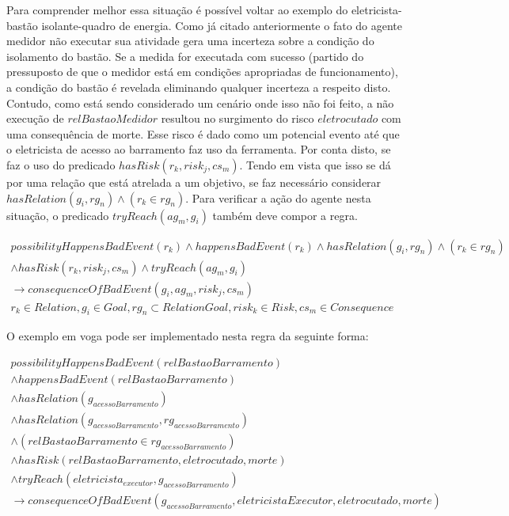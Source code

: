Para comprender melhor essa situação é possível voltar ao exemplo do eletricista-bastão isolante-quadro de energia. Como já citado anteriormente o fato 
do agente medidor não executar sua atividade gera uma incerteza sobre a condição do isolamento do bastão. Se a medida for executada com sucesso 
(partido do pressuposto de que o medidor está em condições apropriadas de funcionamento), a condição do bastão é revelada eliminando qualquer incerteza 
a respeito disto. Contudo, como está sendo considerado um cenário onde isso não foi feito, a não execução de $relBastaoMedidor$ resultou no surgimento 
do risco $eletrocutado$ com uma consequência de morte. Esse risco é dado como um potencial evento até que o eletricista de acesso ao barramento faz uso da 
ferramenta. Por conta disto, se faz o uso do predicado $hasRisk(r_k,risk_j,cs_m)$. Tendo em vista que isso se dá por uma relação que está atrelada a um 
objetivo, se faz necessário considerar $hasRelation(g_i,rg_n) \wedge (r_k \in rg_n)$. Para verificar a ação do agente nesta situação, o predicado 
$tryReach(ag_m,g_i)$ também deve compor a regra.


\begin{eqnarray}\label{paybutiamnotguilty}
	possibilityHappensBadEvent(r_k) \wedge  happensBadEvent(r_k) \wedge hasRelation(g_i,rg_n) \wedge (r_k \in rg_n) \nonumber \\ 
	\wedge hasRisk(r_k,risk_j,cs_m) \wedge tryReach(ag_m,g_i) \nonumber \\ 
	\to consequenceOfBadEvent(g_i,ag_m,risk_j,cs_m) \nonumber \\ 
    r_k \in Relation, g_i \in Goal, rg_n \subset RelationGoal, risk_k \in Risk, cs_m \in Consequence
\end{eqnarray}

O exemplo em voga pode ser implementado nesta regra da seguinte forma: 


\begin{eqnarray}\nonumber
   possibilityHappensBadEvent(relBastaoBarramento) \nonumber \\
    \wedge happensBadEvent(relBastaoBarramento) \nonumber \\ 
    \wedge hasRelation(g_{acessoBarramento}) \nonumber \\  
    \wedge hasRelation(g_{acessoBarramento},rg_{acessoBarramento}) \nonumber \\  
    \wedge (relBastaoBarramento \in rg_{acessoBarramento}) \nonumber \\ 
    \wedge hasRisk(relBastaoBarramento,eletrocutado,morte) \nonumber \\  
    \wedge tryReach(eletricista_{executor},g_{acessoBarramento}) \nonumber \\ 
    \to consequenceOfBadEvent(g_{acessoBarramento},eletricistaExecutor,eletrocutado,morte) \\ \nonumber
\end{eqnarray}

